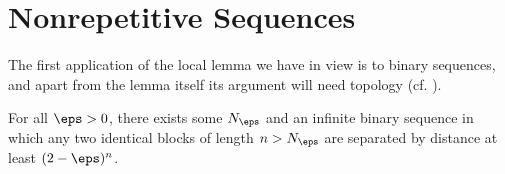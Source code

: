 \section{Nonrepetitive Sequences}

The first application of the local lemma we have in view is to binary sequences, and apart from the lemma itself its argument will need topology (cf. ).

\begin{boxtheorem}
    For all $\eps > 0$, there exists some $N_{\eps}$ and an infinite binary sequence in which any two identical blocks of length $n > N_{\eps}$ are separated by distance at least $(2 - \eps)^n$.
\end{boxtheorem}
